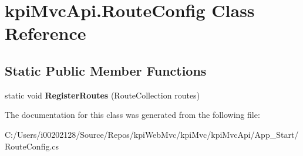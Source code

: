 \hypertarget{classkpi_mvc_api_1_1_route_config}{}\section{kpi\+Mvc\+Api.\+Route\+Config Class Reference}
\label{classkpi_mvc_api_1_1_route_config}
\subsection*{Static Public Member Functions}
\begin{DoxyCompactItemize}
\item 
\mbox{\label{classkpi_mvc_api_1_1_route_config_a7695727c1d42e9d813eb3c0c63802ec3}} 
static void {\bfseries Register\+Routes} (Route\+Collection routes)
\end{DoxyCompactItemize}


The documentation for this class was generated from the following file\+:\begin{DoxyCompactItemize}
\item 
C\+:/\+Users/i00202128/\+Source/\+Repos/kpi\+Web\+Mvc/kpi\+Mvc/kpi\+Mvc\+Api/\+App\+\_\+\+Start/Route\+Config.\+cs\end{DoxyCompactItemize}
